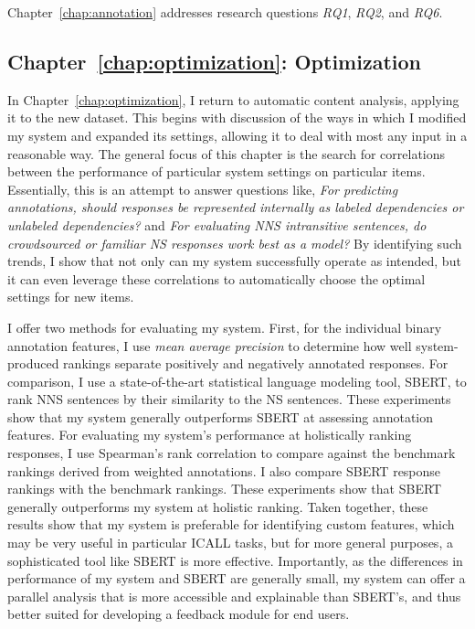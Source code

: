 Chapter~\ref{chap:annotation} addresses research questions \textit{RQ1}, \textit{RQ2}, and \textit{RQ6}.


\subsection{Chapter~\ref{chap:optimization}: Optimization}

In Chapter~\ref{chap:optimization}, I return to automatic content analysis, applying it to the new dataset. This begins with discussion of the ways in which I modified my system and expanded its settings, allowing it to deal with most any input in a reasonable way.
 The general focus of this chapter is the search for correlations between the performance of particular system settings on particular items. Essentially, this is an attempt to answer questions like, \textit{For predicting  annotations, should responses be represented internally as labeled dependencies or unlabeled dependencies?} and \textit{For evaluating NNS intransitive sentences, do crowdsourced or familiar NS responses work best as a model?} By identifying such trends, I show that not only can my system successfully operate as intended, but it can even leverage these correlations to automatically choose the optimal settings for new items.

I offer two methods for evaluating my system. First, for the individual binary annotation features, I use \textit{mean average precision} to determine how well system-produced rankings separate positively and negatively annotated responses. For comparison, I use a state-of-the-art statistical language modeling tool, SBERT, to rank NNS sentences by their similarity to the NS sentences. These experiments show that my system generally outperforms SBERT at assessing annotation features. For evaluating my system's performance at holistically ranking responses, I use Spearman's rank correlation to compare against the benchmark rankings derived from weighted annotations. I also compare SBERT response rankings with the benchmark rankings. These experiments show that SBERT generally outperforms my system at holistic ranking. Taken together, these results show that my system is preferable for identifying custom features, which may be very useful in particular ICALL tasks, but for more general purposes, a sophisticated tool like SBERT is more effective. Importantly, as the differences in performance of my system and SBERT are generally small, my system can offer a parallel analysis that is more accessible and explainable than SBERT's, and thus better suited for developing a feedback module for end users.

